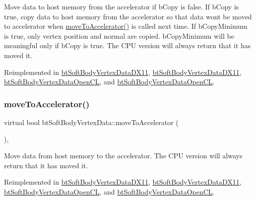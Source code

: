 Move data to host memory from the accelerator if b\+Copy is false. If b\+Copy is true, copy data to host memory from the accelerator so that data won\textquotesingle{}t be moved to accelerator when \hyperlink{classbtSoftBodyVertexData_a2d3f04a5b2461bf95beca6f3fc48e28b}{move\+To\+Accelerator()} is called next time. If b\+Copy\+Minimum is true, only vertex position and normal are copied. b\+Copy\+Minimum will be meaningful only if b\+Copy is true. The C\+PU version will always return that it has moved it. 

Reimplemented in \hyperlink{classbtSoftBodyVertexDataDX11_a32d4193d6e162e0a7a57975ebbab7a16}{bt\+Soft\+Body\+Vertex\+Data\+D\+X11}, \hyperlink{classbtSoftBodyVertexDataDX11_a16599d413d7fc7c96dfb6a335e43079e}{bt\+Soft\+Body\+Vertex\+Data\+D\+X11}, \hyperlink{classbtSoftBodyVertexDataOpenCL_a0ea115bf64323883e19e7bde57a998f1}{bt\+Soft\+Body\+Vertex\+Data\+Open\+CL}, and \hyperlink{classbtSoftBodyVertexDataOpenCL_a89dc6f649bbf848d0af34697fbf1d67b}{bt\+Soft\+Body\+Vertex\+Data\+Open\+CL}.

\mbox{\label{classbtSoftBodyVertexData_a2d3f04a5b2461bf95beca6f3fc48e28b}} 
\subsubsection{\texorpdfstring{move\+To\+Accelerator()}{moveToAccelerator()}\hspace{0.1cm}{\footnotesize\ttfamily [1/2]}}
{\footnotesize\ttfamily virtual bool bt\+Soft\+Body\+Vertex\+Data\+::move\+To\+Accelerator (\begin{DoxyParamCaption}{ }\end{DoxyParamCaption})\hspace{0.3cm}{\ttfamily [inline]}, {\ttfamily [virtual]}}

Move data from host memory to the accelerator. The C\+PU version will always return that it has moved it. 

Reimplemented in \hyperlink{classbtSoftBodyVertexDataDX11_ac12f0c144bc116e3a0e4c11fc0e55365}{bt\+Soft\+Body\+Vertex\+Data\+D\+X11}, \hyperlink{classbtSoftBodyVertexDataDX11_aa68255e1508006f34dedf58855e9db4f}{bt\+Soft\+Body\+Vertex\+Data\+D\+X11}, \hyperlink{classbtSoftBodyVertexDataOpenCL_abd4012054faecf26669f00a04bfd6170}{bt\+Soft\+Body\+Vertex\+Data\+Open\+CL}, and \hyperlink{classbtSoftBodyVertexDataOpenCL_ad30e5afe5e81dbf16af8b10cdcd54044}{bt\+Soft\+Body\+Vertex\+Data\+Open\+CL}.

